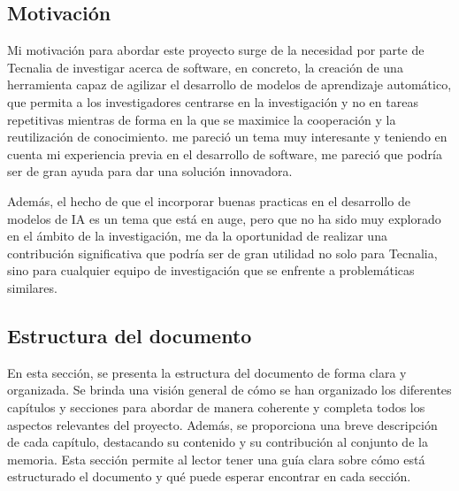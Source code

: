 \subsection{Motivación}
Mi motivación para abordar este proyecto surge de la necesidad por parte de Tecnalia de
investigar acerca de software, en concreto, la creación de una herramienta capaz de agilizar
el desarrollo de modelos de aprendizaje automático, que permita a los investigadores centrarse en 
la investigación y no en tareas repetitivas mientras de forma en la que se maximice la cooperación 
y la reutilización de conocimiento. me pareció un tema muy interesante y teniendo en cuenta mi experiencia previa en el desarrollo de software,
me pareció que podría ser de gran ayuda para dar una solución innovadora. \medskip

Además, el hecho de que el incorporar buenas practicas en el desarrollo de modelos de IA
es un tema que está en auge, pero que no ha sido muy explorado en el ámbito de la investigación,
me da la oportunidad de realizar una contribución significativa que podría ser de gran utilidad
no solo para Tecnalia, sino para cualquier equipo de investigación que se enfrente a problemáticas
similares.

\subsection{Estructura del documento}
En esta sección, se presenta la estructura del documento de forma clara y organizada. Se 
brinda una visión general de cómo se han organizado los diferentes capítulos y secciones 
para abordar de manera coherente y completa todos los aspectos relevantes del proyecto. 
Además, se proporciona una breve descripción de cada capítulo, destacando su contenido 
y su contribución al conjunto de la memoria. Esta sección permite al lector tener una 
guía clara sobre cómo está estructurado el documento y qué puede esperar encontrar en cada 
sección.

